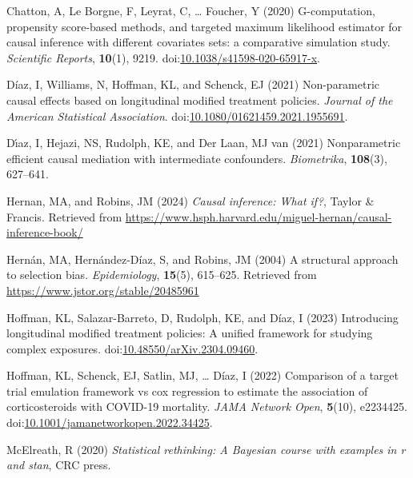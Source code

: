 \documentclass[
  single column]{article}
\newlength{\cslhangindent}
\newenvironment{CSLReferences}[2] %
 {\begin{list}{}{%
  \setlength{\itemindent}{0pt}
  \setlength{\leftmargin}{0pt}
  \setlength{\parsep}{0pt}
  \ifodd #1
   \setlength{\leftmargin}{\cslhangindent}
   \setlength{\itemindent}{-1\cslhangindent}
  \fi
  \setlength{\itemsep}{#2\baselineskip}}}
 {\end{list}}
\begin{document}
\label{refs}
\begin{CSLReferences}{1}{0}
Chatton, A, Le Borgne, F, Leyrat, C, \ldots{} Foucher, Y (2020)
G-computation, propensity score-based methods, and targeted maximum
likelihood estimator for causal inference with different covariates
sets: a comparative simulation study. \emph{Scientific Reports},
\textbf{10}(1), 9219.
doi:\href{https://doi.org/10.1038/s41598-020-65917-x}{10.1038/s41598-020-65917-x}.

Díaz, I, Williams, N, Hoffman, KL, and Schenck, EJ (2021) Non-parametric
causal effects based on longitudinal modified treatment policies.
\emph{Journal of the American Statistical Association}.
doi:\href{https://doi.org/10.1080/01621459.2021.1955691}{10.1080/01621459.2021.1955691}.

Dı́az, I, Hejazi, NS, Rudolph, KE, and Der Laan, MJ van (2021)
Nonparametric efficient causal mediation with intermediate confounders.
\emph{Biometrika}, \textbf{108}(3), 627--641.

Hernan, MA, and Robins, JM (2024) \emph{Causal inference: What if?},
Taylor \& Francis. Retrieved from
\url{https://www.hsph.harvard.edu/miguel-hernan/causal-inference-book/}

Hernán, MA, Hernández-Díaz, S, and Robins, JM (2004) A structural
approach to selection bias. \emph{Epidemiology}, \textbf{15}(5),
615--625. Retrieved from \url{https://www.jstor.org/stable/20485961}

Hoffman, KL, Salazar-Barreto, D, Rudolph, KE, and Díaz, I (2023)
Introducing longitudinal modified treatment policies: A unified
framework for studying complex exposures.
doi:\href{https://doi.org/10.48550/arXiv.2304.09460}{10.48550/arXiv.2304.09460}.

Hoffman, KL, Schenck, EJ, Satlin, MJ, \ldots{} Díaz, I (2022) Comparison
of a target trial emulation framework vs cox regression to estimate the
association of corticosteroids with COVID-19 mortality. \emph{JAMA
Network Open}, \textbf{5}(10), e2234425.
doi:\href{https://doi.org/10.1001/jamanetworkopen.2022.34425}{10.1001/jamanetworkopen.2022.34425}.

McElreath, R (2020) \emph{Statistical rethinking: A {B}ayesian course
with examples in r and stan}, CRC press.


\end{CSLReferences}
\end{document}
